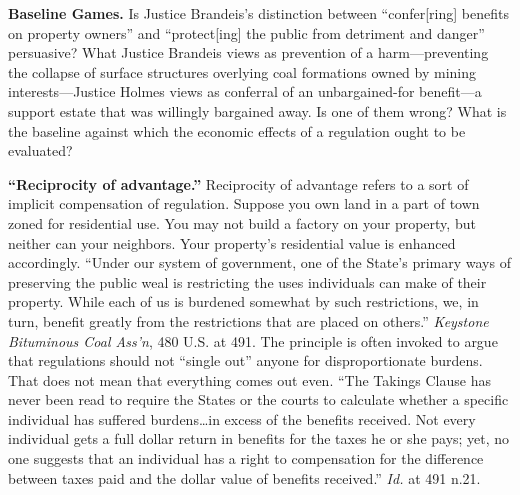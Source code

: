 \item \textbf{Baseline Games.} Is Justice Brandeis's distinction between
``confer[ring] benefits on property owners'' and ``protect[ing] the public from
detriment and danger'' persuasive? What Justice Brandeis views as prevention of
a harm---preventing the collapse of surface structures overlying coal formations
owned by mining interests---Justice Holmes views as conferral of an
unbargained-for benefit---a support estate that was willingly bargained away. Is
one of them wrong? What is the baseline against which the economic effects of a
regulation ought to be evaluated?

\item \textbf{``Reciprocity of advantage.''} Reciprocity of advantage refers
to a sort of implicit compensation of regulation. Suppose you own land in a part
of town zoned for residential use. You may not build a factory on your property,
but neither can your neighbors. Your property's residential value is enhanced
accordingly. ``Under our system of government, one of the State's primary ways
of preserving the public weal is restricting the uses individuals can make of
their property. While each of us is burdened somewhat by such restrictions, we,
in turn, benefit greatly from the restrictions that are placed on others.''
\textit{Keystone Bituminous Coal Ass'n}, 480 U.S. at 491. The principle is often
invoked to argue that regulations should not ``single out'' anyone for
disproportionate burdens. That does not mean that everything comes out even.
``The Takings Clause has never been read to require the States or the courts to
calculate whether a specific individual has suffered burdens\ldots in excess of
the benefits received. Not every individual gets a full dollar return in
benefits for the taxes he or she pays; yet, no one suggests that an individual
has a right to compensation for the difference between taxes paid and the dollar
value of benefits received.'' \textit{Id.} at 491 n.21.

